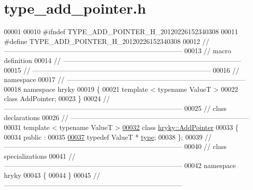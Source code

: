 \hypertarget{type__add__pointer_8h_source}{\section{type\-\_\-add\-\_\-pointer.\-h}
}

\begin{DoxyCode}
00001 
00010 \textcolor{preprocessor}{#ifndef TYPE\_ADD\_POINTER\_H\_20120226152340308}
00011 \textcolor{preprocessor}{}\textcolor{preprocessor}{#define TYPE\_ADD\_POINTER\_H\_20120226152340308}
00012 \textcolor{preprocessor}{}\textcolor{comment}{//
      ------------------------------------------------------------------------------}
00013 \textcolor{comment}{// macro definition}
00014 \textcolor{comment}{//
      ------------------------------------------------------------------------------}
00015 \textcolor{comment}{//
      ------------------------------------------------------------------------------}
00016 \textcolor{comment}{// namespace}
00017 \textcolor{comment}{//
      ------------------------------------------------------------------------------}
00018 \textcolor{keyword}{namespace }hryky
00019 \{
00021     \textcolor{keyword}{template} < \textcolor{keyword}{typename} ValueT >
00022     \textcolor{keyword}{class }AddPointer;
00023 \}
00024 \textcolor{comment}{//
      ------------------------------------------------------------------------------}
00025 \textcolor{comment}{// class declarations}
00026 \textcolor{comment}{//
      ------------------------------------------------------------------------------}
00031 \textcolor{comment}{}\textcolor{keyword}{template} < \textcolor{keyword}{typename} ValueT >
\hypertarget{type__add__pointer_8h_source_l00032}{}\hyperlink{classhryky_1_1_add_pointer}{00032} \textcolor{keyword}{class }\hyperlink{classhryky_1_1_add_pointer}{hryky::AddPointer}
00033 \{
00034 \textcolor{keyword}{public} :
00035 
\hypertarget{type__add__pointer_8h_source_l00037}{}\hyperlink{classhryky_1_1_add_pointer_a02d0c31ee76f5cb3f0ba3ca4c01fc8d3}{00037}     \textcolor{keyword}{typedef} ValueT *        \hyperlink{classhryky_1_1_add_pointer_a02d0c31ee76f5cb3f0ba3ca4c01fc8d3}{type};
00038 \};
00039 \textcolor{comment}{//
      ------------------------------------------------------------------------------}
00040 \textcolor{comment}{// class specializations}
00041 \textcolor{comment}{//
      ------------------------------------------------------------------------------}
00042 \textcolor{keyword}{namespace }hryky
00043 \{
00044 \}
00045 \textcolor{comment}{//
      ------------------------------------------------------------------------------}

\end{DoxyCode}
